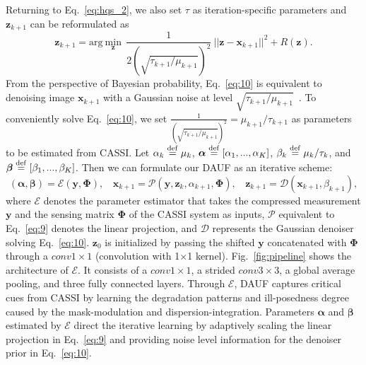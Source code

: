 \documentclass{article}
\begin{document}
Returning to Eq.~\eqref{eq:hqs_2}, we also set $\tau$ as iteration-specific parameters and $\mathbf{z}_{k+1}$ can be reformulated as 
\begin{equation}
	\mathbf{z}_{k+1} = \text{arg}~\underset{\mathbf{z}}{\text{min}}~~\frac{1}{2(\sqrt{\tau_{k+1}/\mu_{k+1}})^2}~|| \mathbf{z} - \mathbf{x}_{k+1} ||^2 +  R(\mathbf{z}).
	\label{eq:10}
\end{equation}
From the perspective of Bayesian probability, Eq.~\eqref{eq:10} is equivalent to denoising image $\mathbf{x}_{k+1}$ with a Gaussian noise at level $\sqrt{\tau_{k+1}/\mu_{k+1}}$~\cite{pnp_3}. To conveniently solve Eq.~\eqref{eq:10}, we set $\frac{1}{(\sqrt{\tau_{k+1}/\mu_{k+1}})^2} = \mu_{k+1}/\tau_{k+1}$ as parameters to be estimated from CASSI. Let $\alpha_k \stackrel{\rm def}{=} \mu_k$, $\boldsymbol{\alpha} \stackrel{\rm def}{=} [\alpha_1, ... ,\alpha_K]$, $\beta_k \stackrel{\rm def}{=} \mu_k/\tau_k$, and $\boldsymbol{\beta} \stackrel{\rm def}{=} [\beta_1, ... ,\beta_K]$. Then we can formulate our DAUF as an iterative scheme: 
\begin{equation}
	(\boldsymbol{\alpha}, \boldsymbol{\beta}) =  \mathcal{E}(\mathbf{y}, \mathbf{\Phi}),~~~~\mathbf{x}_{k+1} = \mathcal{P}(\mathbf{y}, \mathbf{z}_k, \alpha_{k+1}, \mathbf{\Phi}),~~~~\mathbf{z}_{k+1} = \mathcal{D}(\mathbf{x}_{k+1}, \beta_{k+1}), 
	\label{eq:dauf}
\end{equation}
where $\mathcal{E}$ denotes the parameter estimator that takes the compressed measurement $\mathbf{y}$ and the sensing matrix $\mathbf{\Phi}$ of the CASSI system as inputs, $\mathcal{P}$ equivalent to  Eq.~\eqref{eq:9} denotes the linear projection, and $\mathcal{D}$ represents the Gaussian denoiser solving Eq.~\eqref{eq:10}. $\mathbf{z}_0$ is initialized by passing the shifted $\mathbf{y}$ concatenated with $\mathbf{\Phi}$ through a $conv1\times1$ (convolution with 1$\times$1 kernel).  Fig.~\ref{fig:pipeline} shows the  architecture of $\mathcal{E}$. It consists of a $conv1\times1$, a strided $conv3\times3$, a global average pooling, and three fully connected layers. Through $\mathcal{E}$, DAUF captures critical cues from CASSI by learning the degradation patterns and ill-posedness degree caused by the mask-modulation and dispersion-integration. Parameters $\boldsymbol{\alpha}$ and $\boldsymbol{\beta}$ estimated by $\mathcal{E}$ direct the iterative learning by adaptively scaling the linear projection in Eq.~\eqref{eq:9} and providing noise level information for the denoiser prior in Eq.~\eqref{eq:10}. 


\vspace{-1.5mm}
\end{document}
